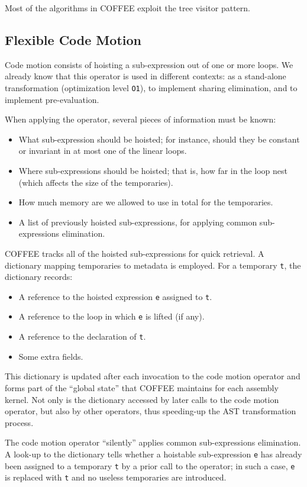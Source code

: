 Most of the algorithms in COFFEE exploit the tree visitor pattern.

\subsection{Flexible Code Motion}
\label{sec:coffee:cm}
Code motion consists of hoisting a sub-expression out of one or more loops. We already know that this operator is used in different contexts: as a stand-alone transformation (optimization level \texttt{O1}), to implement sharing elimination, and to implement pre-evaluation. 

When applying the operator, several pieces of information must be known:
\begin{itemize}
\item What sub-expression should be hoisted; for instance, should they be constant or invariant in at most one of the linear loops.
\item Where sub-expressions should be hoisted; that is, how far in the loop nest (which affects the size of the temporaries).
\item How much memory are we allowed to use in total for the temporaries.
\item A list of previously hoisted sub-expressions, for applying common sub-expressions elimination.
\end{itemize}

COFFEE tracks all of the hoisted sub-expressions for quick retrieval. A dictionary mapping temporaries to metadata is employed. For a temporary \texttt{t}, the dictionary records:
\begin{itemize}
\item A reference to the hoisted expression \texttt{e} assigned to \texttt{t}.
\item A reference to the loop in which \texttt{e} is lifted (if any).
\item A reference to the declaration of \texttt{t}.
\item Some extra fields.
\end{itemize}
This dictionary is updated after each invocation to the code motion operator and forms part of the ``global state'' that COFFEE maintains for each assembly kernel. Not only is the dictionary accessed by later calls to the code motion operator, but also by other operators, thus speeding-up the AST transformation process.

The code motion operator ``silently'' applies common sub-expressions elimination. A look-up to the dictionary tells whether a hoistable sub-expression \texttt{e} has already been assigned to a temporary \texttt{t} by a prior call to the operator; in such a case, \texttt{e} is replaced with \texttt{t} and no useless temporaries are introduced. 

